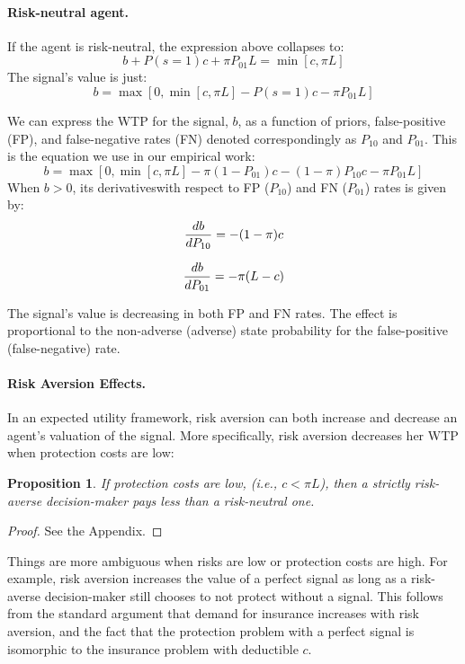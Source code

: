 \documentclass[12pt,a4paper]{article}
\newtheorem{theorem}{Proposition}
\begin{document}
\paragraph{Risk-neutral agent.} If the agent is risk-neutral, the expression above collapses to:
\[b+P(s=1)c+\pi P_{01}L=\min[c,\pi L]
\]
The signal's value is just:
\[
b=\max[0,\min[c,\pi L]-P(s=1)c-\pi P_{01}L]
\]

We can express the WTP for the signal, $b$, as a function of priors, false-positive (FP), and false-negative rates (FN) denoted correspondingly as $P_{10}$ and $P_{01}$. This is the equation we use in our empirical work:
\begin{equation}
b=\max[0,\min[c,\pi L]-\pi (1-P_{01})c-(1-\pi)P_{10}c-\pi P_{01}L]
\end{equation}\label{eq:rnWTP}
When $b>0$, its derivativeswith respect to FP ($P_{10}$) and FN ($P_{01}$) rates is given by:
\begin{equation}\label{eq:dWTP_dFP}
{db\over dP_{10}}=-(1-\pi)c
\end{equation}

\begin{equation}\label{eq:dWTP_dFN}
{db\over dP_{01}}=-\pi(L-c)
\end{equation}
\vspace{10pt}

The signal's value is decreasing in both FP and FN rates. The effect is proportional to the non-adverse (adverse) state probability for the false-positive (false-negative) rate.

\paragraph{Risk Aversion Effects.} In an expected utility framework, risk aversion can both increase and decrease an agent's valuation of the signal. More specifically, risk aversion decreases her WTP when protection costs are low: 

\begin{theorem}
 If protection costs are low, (i.e., $c<\pi L$), then a strictly risk-averse decision-maker pays less than a risk-neutral one.
\end{theorem} 
\begin{proof}
See the Appendix.
\end{proof}

Things are more ambiguous when risks are low or protection costs are high. For example, risk aversion increases the value of a perfect signal as long as a risk-averse decision-maker still chooses to not protect without a signal. This follows from the standard argument that demand for insurance increases with risk aversion, and the fact that the protection problem with a perfect signal is isomorphic to the insurance problem with deductible $c$. 
\end{document}
